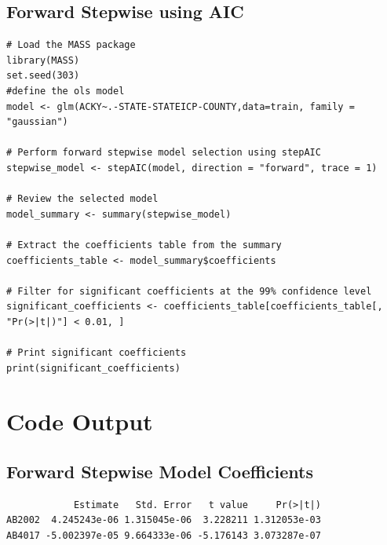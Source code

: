 \documentclass[a4paper,12pt]{article}
\begin{document}
\subsection{Forward Stepwise using AIC}
\begin{lstlisting}
# Load the MASS package
library(MASS)
set.seed(303)
#define the ols model
model <- glm(ACKY~.-STATE-STATEICP-COUNTY,data=train, family = "gaussian")

# Perform forward stepwise model selection using stepAIC
stepwise_model <- stepAIC(model, direction = "forward", trace = 1)

# Review the selected model
model_summary <- summary(stepwise_model)

# Extract the coefficients table from the summary
coefficients_table <- model_summary$coefficients

# Filter for significant coefficients at the 99% confidence level
significant_coefficients <- coefficients_table[coefficients_table[, "Pr(>|t|)"] < 0.01, ]

# Print significant coefficients
print(significant_coefficients)
\end{lstlisting}

\section{Code Output}
\subsection{Forward Stepwise Model Coefficients}
\begin{lstlisting}
            Estimate   Std. Error   t value     Pr(>|t|)
AB2002  4.245243e-06 1.315045e-06  3.228211 1.312053e-03
AB4017 -5.002397e-05 9.664333e-06 -5.176143 3.073287e-07
\end{lstlisting}
\end{document}
